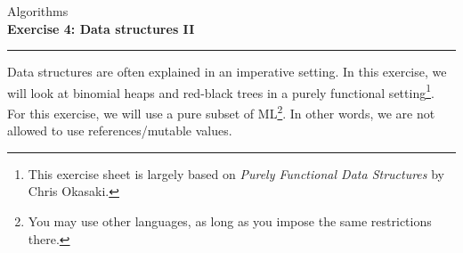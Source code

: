 \documentclass[10pt,a4paper,fleqn]{exam}
\begin{document}
\begin{center}
\Large Algorithms \\
\LARGE \textbf{Exercise 4: Data structures II} \\
\end{center}

\hrule

\vspace{0.5cm}

\marksnotpoints
\pointsdroppedatright
\marksnotpoints
\marginpointname{ \points}




Data structures are often explained in an imperative setting. In this exercise, we will look at binomial heaps and red-black trees in a purely functional setting\footnote{This exercise sheet is largely based on \emph{Purely Functional Data Structures} by Chris Okasaki.}. For this exercise, we will use a pure subset of ML\footnote{You may use other languages, as long as you impose the same restrictions there.}. In other words, we are not allowed to use references/mutable values.
\end{document}
